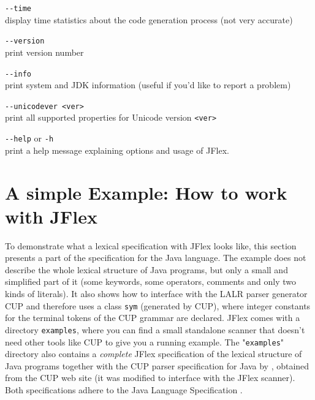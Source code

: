 \documentclass[11pt]{scrartcl}
\newcommand{\trit}{\em}
\begin{document}
\begin{description}
\item \verb+--time+\\
  display time statistics about the code generation process
  (not very accurate)

\item \verb+--version+\\
  print version number 

\item \verb+--info+\\
  print system and JDK information (useful if you'd like
  to report a problem)
  
\item \verb+--unicodever <ver>+\\
  print all supported properties for Unicode version \verb+<ver>+

\item \verb+--help+ or \texttt{-h}\\
  print a help message explaining options and usage of JFlex.
\end{description}

\section{A simple Example: How to work with JFlex}\label{Example}
To demonstrate what a lexical specification with JFlex looks like, this
section presents a part of the specification for the Java language.
The example does not describe the whole lexical structure of Java programs,
but only a small and simplified part of it (some keywords, some operators,
comments and only two kinds of literals). It also shows how to interface
with the LALR parser generator CUP \cite{CUP} and therefore
uses a class \texttt{sym} (generated by CUP), where integer constants for
the terminal tokens of the CUP grammar are declared. JFlex comes with a
directory \texttt{examples}, where you can find a small standalone scanner
that doesn't need other tools like CUP to give you a running example.
The "\texttt{examples}" directory also contains a {\trit complete} JFlex 
specification of the lexical structure of Java programs together with the 
CUP parser specification for Java by 
, obtained
from the CUP \cite{CUP} web site (it was modified to interface with the JFlex scanner). 
Both specifications adhere to the Java Language Specification \cite{LangSpec}.
\end{document}
